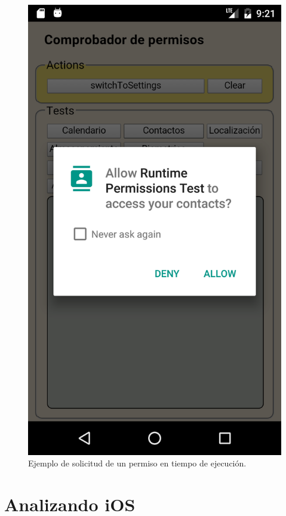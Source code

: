 \begin{figure}[htbp]
    \centering
    \includegraphics[width=0.3\linewidth]{imgs/chapter5/allow_contact}
    \caption{Ejemplo de solicitud de un permiso en tiempo de ejecución.}
    \label{fig:ch01:permission-request}
\end{figure}
\section{Analizando iOS}
